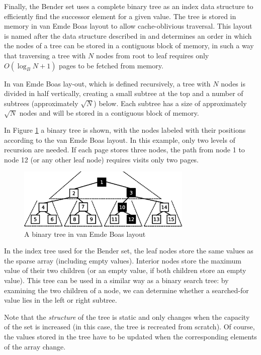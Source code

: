 \documentclass{acm_proc_article-sp}
\begin{document}
Finally, the Bender set uses a complete binary tree as an index data structure
to efficiently find the successor element for a given value. The tree is
stored in memory in van Emde Boas layout to allow cache-oblivious
traversal. This layout is named after the data structure described in
\cite{vanemdeboas1976dai} and determines an order in which the nodes of a
tree can be stored in a contiguous block of memory, in such a way that traversing
a tree with $N$ nodes from root to leaf requires only $O(\log_B N + 1)$ pages to be
fetched from memory.

In van Emde Boas lay-out, which is defined recursively, a tree with 
$N$ nodes is divided in half vertically, creating a small subtree at the
top and a number of subtrees (approximately $\sqrt{N}$) below. Each subtree
has a size of approximately $\sqrt{N}$ nodes and will be stored in a
contiguous block of memory.

In Figure \ref{fig-van-emde-boas} a binary tree is shown, with the nodes
labeled with their positions according to the van Emde Boas layout.
In this example, only two levels of recursion are needed. If each page
stores three nodes, the path from node 1 to node 12 (or any other leaf node)
requires visits only two pages.

\begin{figure}
\centering
\includegraphics[width=83mm]{vanemdeboas}
\caption{A binary tree in van Emde Boas layout}
\label{fig-van-emde-boas}
\end{figure}

In the index tree used for the Bender set, the leaf nodes store the same values
as the sparse array (including empty values).
Interior nodes store the maximum value of their two children (or an empty value,
if both children store an empty value).
This tree can be used in a similar way as a binary search tree: by examining the
two children of a node, we can determine whether a searched-for value lies in the
left or right subtree.

Note that the \emph{structure} of the tree is static and only changes when the
capacity of the set is increased (in this case, the tree is recreated from scratch).
Of course, the values stored in the tree have to be updated when the corresponding
elements of the array change.
\end{document}
